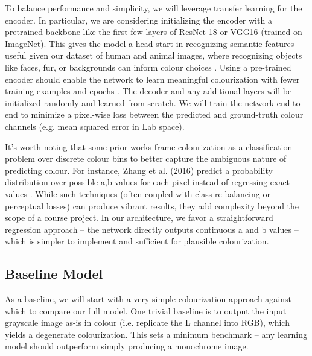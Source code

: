 \documentclass{article} %
\begin{document}
To balance performance and simplicity, we will leverage transfer learning for the encoder. In particular, we are considering initializing the encoder with a pretrained backbone like the first few layers of ResNet-18 or VGG16 (trained on ImageNet). This gives the model a head-start in recognizing semantic features—useful given our dataset of human and animal images, where recognizing objects like faces, fur, or backgrounds can inform colour choices \cite{olah2022lettherebecolor}. Using a pre-trained encoder should enable the network to learn meaningful colourization with fewer training examples and epochs \cite{olah2022lettherebecolor}. The decoder and any additional layers will be initialized randomly and learned from scratch. We will train the network end-to-end to minimize a pixel-wise loss between the predicted and ground-truth colour channels (e.g. mean squared error in Lab space).

It’s worth noting that some prior works frame colourization as a classification problem over discrete colour bins to better capture the ambiguous nature of predicting colour. For instance, Zhang et al. (2016) predict a probability distribution over possible a,b values for each pixel instead of regressing exact values \cite{olah2022lettherebecolor}. While such techniques (often coupled with class re-balancing or perceptual losses) can produce vibrant results, they add complexity beyond the scope of a course project. In our architecture, we favor a straightforward regression approach – the network directly outputs continuous a and b values – which is simpler to implement and sufficient for plausible colourization.

\subsection{Baseline Model}

As a baseline, we will start with a very simple colourization approach against which to compare our full model. One trivial baseline is to output the input grayscale image as-is in colour (i.e. replicate the L channel into RGB), which yields a degenerate colourization. This sets a minimum benchmark – any learning model should outperform simply producing a monochrome image.
\end{document}

